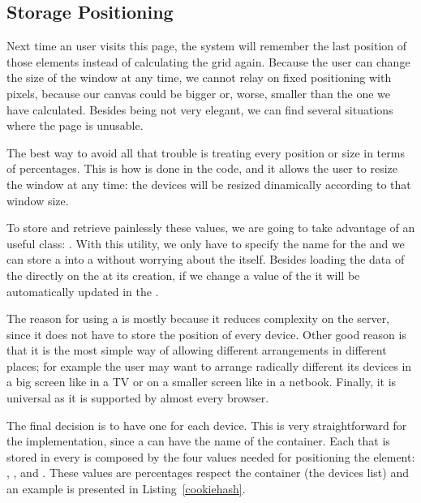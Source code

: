 \nicesubsectionending


\subsection{Storage Positioning} %
\label{sub:storage}

Next time an user visits this page, the system will remember the last position of those elements instead of calculating the grid again.
Because the user can change the size of the window at any time, we cannot relay on fixed positioning with pixels, because our canvas could be bigger or, worse, smaller than the one we have calculated.
Besides being not very elegant, we can find several situations where the page is unusable.

The best way to avoid all that trouble is treating every position or size in terms of percentages.
This is how is done in the code, and it allows the user to resize the window at any time: the devices will be resized dinamically according to that window size.

To store and retrieve painlessly these values, we are going to take advantage of an useful  class:  \cite{MooHashCookie}.
With this utility, we only have to specify the name for the  and we can store a  into a  without worrying about the  itself.
Besides loading the data of the  directly on the  at its creation, if we change a value of the  it will be automatically updated in the .

The reason for using a  is mostly because it reduces complexity on the server, since it does not have to store the position of every device.
Other good reason is that it is the most simple way of allowing different arrangements in different places; for example the user may want to arrange radically different its devices in a big screen like in a TV or on a smaller screen like in a netbook.
Finally, it is universal as it is supported by almost every browser.

The final decision is to have one  for each device.
This is very straightforward for the implementation, since a  can
have the name of the container.
Each  that is stored in every  is composed by the four
values needed for positioning the element: , ,
 and .
These values are percentages respect the container (the devices list) and an
 example is presented in Listing~\vref{cookiehash}.

